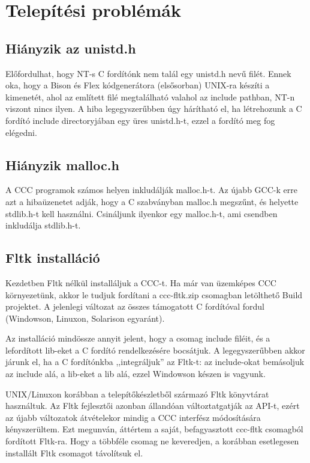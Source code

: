 \section{Telepítési problémák}

\subsection{Hiányzik az unistd.h} 
Előfordulhat, hogy NT-s C fordítónk nem talál egy unistd.h nevű filét.
Ennek oka, hogy a Bison és Flex kódgenerátora (elsősorban) UNIX-ra 
készíti a kimenetét, ahol az említett filé megtalálható valahol az
include pathban, NT-n viszont nincs ilyen. A hiba legegyszerűbben 
úgy hárítható el, ha létrehozunk a C fordító include directoryjában 
egy üres unistd.h-t, ezzel a fordító meg fog elégedni.

\subsection{Hiányzik malloc.h}
A CCC programok számos helyen inkludálják malloc.h-t.
Az újabb GCC-k erre azt a hibaüzenetet adják, 
hogy a C szabványban  malloc.h megszűnt, és helyette 
stdlib.h-t kell használni. Csináljunk ilyenkor egy malloc.h-t, 
ami csendben inkludálja stdlib.h-t.


\subsection{Fltk installáció} 

Kezdetben Fltk nélkül installáljuk a CCC-t.
Ha már van üzemképes CCC környezetünk, akkor le tudjuk 
fordítani a ccc-fltk.zip csomagban letölthető Build projektet. 
A jelenlegi változat az összes támogatott C fordítóval fordul 
(Windowson, Linuxon, Solarison egyaránt).

Az installáció mindössze annyit jelent, hogy a csomag
include filéit, és a lefordított lib-eket a C fordító
rendelkezésére bocsátjuk. A legegyszerűbben akkor járunk el, 
ha a  C fordítónkba ,,integráljuk'' az Fltk-t: az include-okat 
bemásoljuk az include alá, a lib-eket a lib alá, ezzel
Windowson készen is vagyunk.

UNIX/Linuxon korábban a telepítőkészletből származó Fltk könyvtárat használtuk. 
Az Fltk fejlesztői azonban állandóan változtatgatják az API-t, ezért az újabb
változatok átvételekor mindig a CCC interfész módosítására kényszerültem. 
Ezt megunván, áttértem a saját, befagyasztott ccc-fltk csomagból fordított 
Fltk-ra. Hogy a többféle csomag ne keveredjen, a korábban esetlegesen 
installált Fltk csomagot távolítsuk el.

